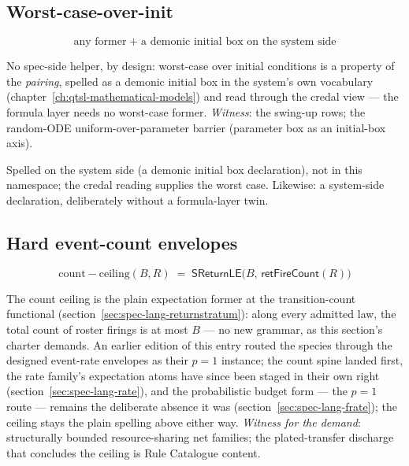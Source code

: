 

\subsection{Worst-case-over-init}
\label{sec:spec-lang-dwcinit}

\[
\text{any former} \;+\; \text{a demonic initial box on the system side}
\]

No spec-side helper, by design: worst-case over initial conditions is
a property of the \emph{pairing}, spelled as a demonic initial box in
the system's own vocabulary
(chapter~\ref{ch:qtsl-mathematical-models}) and read through the
credal view --- the formula layer needs no worst-case former.
\emph{Witness}: the swing-up rows; the random-ODE
uniform-over-parameter barrier (parameter box as an initial-box
axis).

Spelled on the system side (a demonic initial box declaration), not
in this namespace; the credal reading supplies the worst case.
Likewise: a system-side declaration, deliberately without a
formula-layer twin.

\subsection{Hard event-count envelopes}
\label{sec:spec-lang-devcount}

\[
\mathrm{count{-}ceiling}(B, R) \;=\;
\mathsf{SReturnLE}\bigl(B,\, \mathsf{retFireCount}(R)\bigr)
\]

The count ceiling is the plain expectation former at the
transition-count functional
(section~\ref{sec:spec-lang-returnstratum}): along every admitted
law, the total count of roster firings is at most $B$ --- no new
grammar, as this section's charter demands. An earlier
edition of this entry routed the species through the designed
event-rate envelopes as their $p = 1$ instance; the count spine
landed first, the rate family's expectation atoms have since been
staged in their own right (section~\ref{sec:spec-lang-rate}), and
the probabilistic budget form --- the $p = 1$ route --- remains the
deliberate absence it was (section~\ref{sec:spec-lang-frate});
the ceiling stays the plain spelling above either way. \emph{Witness for the
demand}: structurally bounded resource-sharing net families; the
plated-transfer discharge that concludes the ceiling is Rule
Catalogue content.


